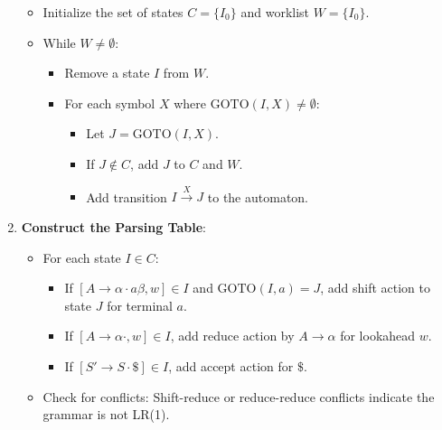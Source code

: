 \begin{enumerate}
\begin{itemize}
            \item Initialize the set of states \( C = \{I_0\} \) and worklist \( W = \{I_0\} \).
            \item While \( W \neq \emptyset \):
                \begin{itemize}
                    \item Remove a state \( I \) from \( W \).
                    \item For each symbol \( X \) where \( \text{GOTO}(I, X) \neq \emptyset \):
                        \begin{itemize}
                            \item Let \( J = \text{GOTO}(I, X) \).
                            \item If \( J \notin C \), add \( J \) to \( C \) and \( W \).
                            \item Add transition \( I \xrightarrow{X} J \) to the automaton.
                        \end{itemize}
                \end{itemize}
        \end{itemize}
    \item \textbf{Construct the Parsing Table}:
        \begin{itemize}
            \item For each state \( I \in C \):
                \begin{itemize}
                    \item If \( [A \to \alpha \cdot a \beta, w] \in I \) and \( \text{GOTO}(I, a) = J \), add shift action to state \( J \) for terminal \( a \).
                    \item If \( [A \to \alpha \cdot, w] \in I \), add reduce action by \( A \to \alpha \) for lookahead \( w \).
                    \item If \( [S' \to S \cdot \$] \in I \), add accept action for \( \$ \).
                \end{itemize}
            \item Check for conflicts: Shift-reduce or reduce-reduce conflicts indicate the grammar is not LR(1).
        \end{itemize}
\end{enumerate}
